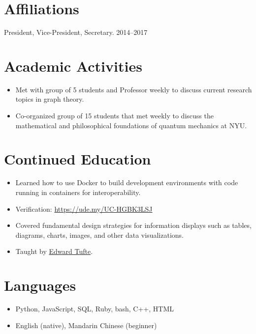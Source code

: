 \documentclass{cultvoucher}
\begin{document}
\section{Affiliations}




{{\small President, Vice-President, Secretary.}}
{2014--2017}

\section{Academic Activities}
\begin{itemize}
	\item Met with group of 5 students and Professor weekly to discuss current research topics in graph theory.
\end{itemize}

\begin{itemize}
	\item Co-organized group of 15 students that met weekly to discuss the mathematical and philosophical foundations of quantum mechanics at NYU.
\end{itemize}

\section{Continued Education}
\begin{itemize}
	\item Learned how to use Docker to build development environments with code running in containers for interoperability.
	\item Verification: \url{https://ude.my/UC-HGBK3LSJ}
\end{itemize}
\begin{itemize}
	\item Covered fundamental design strategies for information displays such as tables, diagrams, charts, images, and other data visualizations.
	\item Taught by \href{https://www.edwardtufte.com/tufte/}{Edward Tufte}.
\end{itemize}

\section{Languages}
\begin{itemize}
	\item Python, JavaScript, SQL, Ruby, bash, C++, HTML
	\item English (native), Mandarin Chinese (beginner)
\end{itemize}
\end{document}
